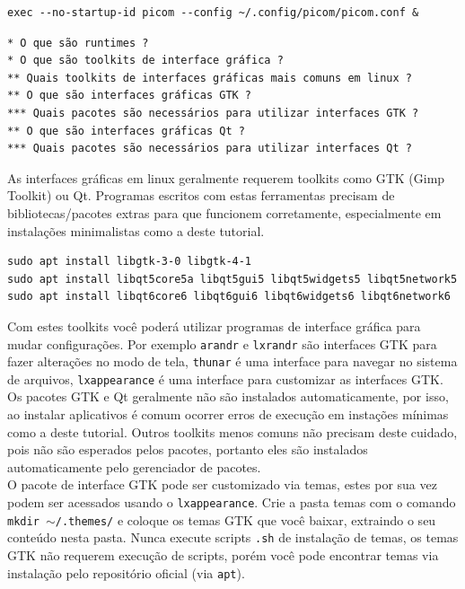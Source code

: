 \documentclass[12pt,a4paper]{article}
\begin{document}
\begin{lstlisting}
exec --no-startup-id picom --config ~/.config/picom/picom.conf & 
\end{lstlisting}

\vspace{\baselineskip}

\begin{lstlisting}
* O que são runtimes ? 
* O que são toolkits de interface gráfica ?
** Quais toolkits de interfaces gráficas mais comuns em linux ? 
** O que são interfaces gráficas GTK ?
*** Quais pacotes são necessários para utilizar interfaces GTK ?
** O que são interfaces gráficas Qt ? 
*** Quais pacotes são necessários para utilizar interfaces Qt ? 
\end{lstlisting}

\vspace{\baselineskip}

As interfaces gráficas em linux geralmente requerem toolkits como GTK (Gimp Toolkit) ou Qt. Programas escritos com estas ferramentas precisam de bibliotecas/pacotes extras para que funcionem corretamente, especialmente em instalações minimalistas como a deste tutorial. \\

\begin{lstlisting}
sudo apt install libgtk-3-0 libgtk-4-1
sudo apt install libqt5core5a libqt5gui5 libqt5widgets5 libqt5network5
sudo apt install libqt6core6 libqt6gui6 libqt6widgets6 libqt6network6
\end{lstlisting}

\vspace{\baselineskip}

Com estes toolkits você poderá utilizar programas de interface gráfica para mudar configurações. Por exemplo \texttt{arandr} e \texttt{lxrandr} são interfaces GTK para fazer alterações no modo de tela, \texttt{thunar} é uma interface para navegar no sistema de arquivos, \texttt{lxappearance} é uma interface para customizar as interfaces GTK.\\

Os pacotes GTK e Qt geralmente não são instalados automaticamente, por isso, ao instalar aplicativos é comum ocorrer erros de execução em instações mínimas como a deste tutorial. Outros toolkits menos comuns não precisam deste cuidado, pois não são esperados pelos pacotes, portanto eles são instalados automaticamente pelo gerenciador de pacotes. \\

O pacote de interface GTK pode ser customizado via temas, estes por sua vez podem ser acessados usando o \texttt{lxappearance}. Crie a pasta temas com o comando \texttt{mkdir $\sim$/.themes/} e coloque os temas GTK que você baixar, extraindo o seu conteúdo nesta pasta. Nunca execute scripts \texttt{.sh} de instalação de temas, os temas GTK não requerem execução de scripts, porém você pode encontrar temas via instalação pelo repositório oficial (via \texttt{apt}). 
\end{document}
